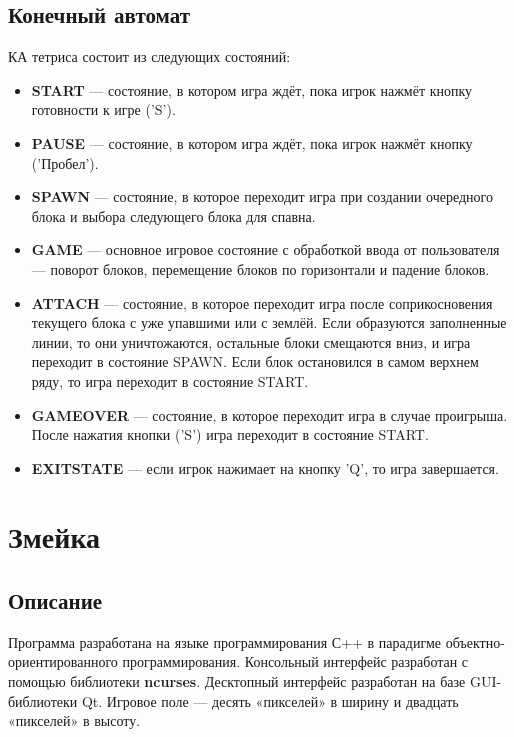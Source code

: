 \documentclass{article}
\begin{document}
\subsection{Конечный автомат}
КА тетриса состоит из следующих состояний:
\begin{itemize}
    \item \textbf{START} — состояние, в котором игра ждёт, пока игрок нажмёт кнопку готовности к игре ('S').
    \item \textbf{PAUSE} — состояние, в котором игра ждёт, пока игрок нажмёт кнопку ('Пробел').
    \item \textbf{SPAWN} — состояние, в которое переходит игра при создании очередного блока и выбора следующего блока для спавна.
    \item \textbf{GAME} — основное игровое состояние с обработкой ввода от пользователя — поворот блоков, перемещение блоков по горизонтали и падение блоков.
    \item \textbf{ATTACH} — состояние, в которое переходит игра после соприкосновения текущего блока с уже упавшими или с землёй. Если образуются заполненные линии, то они уничтожаются, остальные блоки смещаются вниз, и игра переходит в состояние SPAWN. Если блок остановился в самом верхнем ряду, то игра переходит в состояние START.
    \item \textbf{GAMEOVER} — состояние, в которое переходит игра в случае проигрыша. После нажатия кнопки ('S') игра переходит в состояние START.
    \item \textbf{EXITSTATE} — если игрок нажимает на кнопку 'Q', то игра завершается.
\end{itemize}

\section{Змейка}
\subsection{Описание}
{\small Программа разработана на языке программирования С++ в парадигме объектно-ориентированного программирования. Консольный интерфейс разработан с помощью библиотеки \textbf{ncurses}. 
Десктопный интерфейс разработан на базе GUI-библиотеки Qt.
Игровое поле — десять «пикселей» в ширину и двадцать «пикселей» в высоту.}
\end{document}
